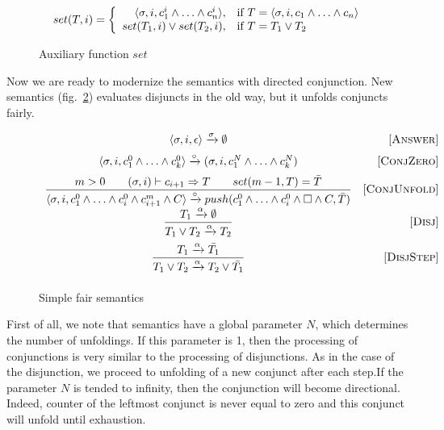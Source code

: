 \begin{figure}[h!]
\[
set(T, i) =
\left\{
\begin{array}{rl}
\langle \sigma, i, c_1^i \land \ldots \land c_n^i \rangle, & \mbox{if } T = \langle \sigma, i, c_1 \land \ldots \land c_n \rangle \\
set(T_1, i) \lor set(T_2, i), & \mbox{if } T = T_1 \lor T_2
\end{array}
\right.
\]
\caption{Auxiliary function $set$}
\label{fair:set-semantics}
\end{figure}

Now we are ready to modernize the semantics with directed conjunction. New semantics (fig.~\ref{fair:naive-semantics}) evaluates disjuncts in the old way, but it unfolds conjuncts fairly.

\begin{figure}[h!]
\[\begin{array}{cr}

      {\langle \sigma, i, \epsilon \rangle \xrightarrow{\sigma} \emptyset}  
&     \mbox{[\textsc{Answer}]} \\[2mm]
      {\langle \sigma, i, c_1^0 \land \ldots \land c_k^0 \rangle \xrightarrow{\circ} (\sigma, i, c_1^N \land \ldots \land c_k^N)}
&     \mbox{[\textsc{ConjZero}]} \\[2mm]
\dfrac{m > 0 \qquad (\sigma, i) \vdash c_{i+1} \Rightarrow T \qquad set(m - 1, T) = \bar{T}}
      {\langle \sigma, i, c_1^0 \land \ldots \land c_i^0 \land c_{i+1}^m \land C \rangle \xrightarrow{\circ} push(c_1^0 \land \ldots \land c_i^0 \land \Box \land C, \bar{T})}
&     \mbox{[\textsc{ConjUnfold}]} \\[2mm]
\dfrac{T_1 \xrightarrow{\alpha} \emptyset}
      {T_1 \lor T_2 \xrightarrow{\alpha} T_2}
&     \mbox{[\textsc{Disj}]} \\[4mm]
\dfrac{T_1 \xrightarrow{\alpha} \bar{T_1}}
      {T_1 \lor T_2 \xrightarrow{\alpha} T_2 \lor\bar{T_1}}
&     \mbox{[\textsc{DisjStep}]} \\[4mm]
\end{array}\]
\caption{Simple fair semantics}
\label{fair:naive-semantics}
\end{figure}

First of all, we note that semantics have a global parameter $N$, which determines the number of unfoldings. 
If this parameter is 1, then the processing of conjunctions is very similar to the processing of disjunctions. 
As in the case of the disjunction, we proceed to unfolding of a new conjunct after each step.If the parameter $N$ is tended to infinity, then the conjunction will become directional. Indeed, counter of the leftmost conjunct is never equal to zero and this conjunct will unfold until exhaustion.

